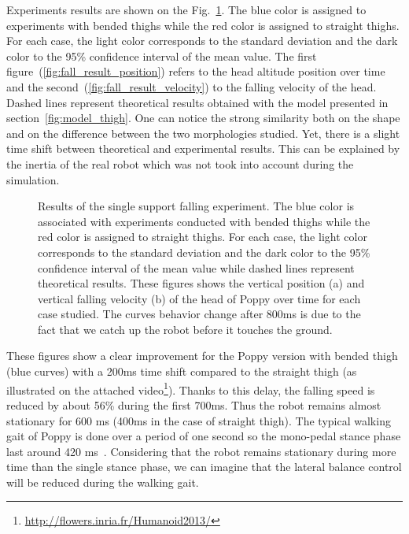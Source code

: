 Experiments results are shown on the Fig.~\ref{fig:falling_results}. The blue color is assigned to experiments with bended thighs while the red color is assigned to straight thighs. For each case, the light color corresponds to the standard deviation and the dark color to the 95\% confidence interval of the mean value. The first figure~(\ref{fig:fall_result_position}) refers to the head altitude position over time and the second~(\ref{fig:fall_result_velocity}) to the falling velocity of the head. Dashed lines represent theoretical results obtained with the model presented in section~\ref{fig:model_thigh}. One can notice the strong similarity both on the shape and on the difference between the two morphologies studied. Yet, there is a slight time shift between theoretical and experimental results. This can be explained by the inertia of the real robot which was not took into account during the simulation.

\begin{figure}[h]
\centering
    \hfil
    \caption{Results of the single support falling experiment.
    The blue color is associated with experiments conducted with bended thighs while the red color is assigned to straight thighs.
    For each case, the light color corresponds to the standard deviation and the dark color to the 95\% confidence interval of the mean value while dashed lines represent theoretical results.
    These figures shows the vertical position (a) and vertical falling velocity (b) of the head of Poppy over time for each case studied.
    The curves behavior change after 800ms is due to the fact that we catch up the robot before it touches the ground.}
    \label{fig:falling_results}
\end{figure}

These figures show a clear improvement for the Poppy version with bended thigh (blue curves) with a 200ms time shift compared to the straight thigh (as illustrated on the attached video\footnote{\url{http://flowers.inria.fr/Humanoid2013/}\label{video}}).
Thanks to this delay, the falling speed is reduced by about 56\% during the first 700ms. Thus the robot remains almost stationary for 600 ms (400ms in the case of straight thigh). The typical walking gait of Poppy is done over a period of one second so the mono-pedal stance phase last around 420 ms~\cite{lapeyre2013poppy}. Considering that the robot remains stationary during more time than the single stance phase, we can imagine that the lateral balance control will be reduced during the walking gait.



